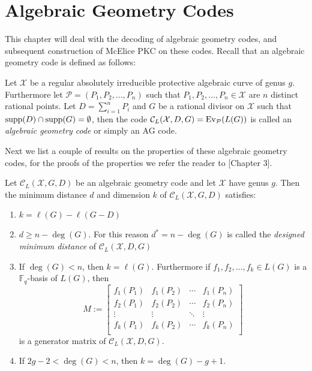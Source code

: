 \chapter{Algebraic Geometry Codes}
This chapter will deal with the decoding of algebraic geometry codes, and subsequent construction of McElice PKC on these codes. Recall that an algebraic geometry code is defined as follows:
\begin{definition}
Let $\mathcal{X}$ be a regular absolutely irreducible protective algebraic curve of genus $g$. Furthermore let $\mathcal{P}=\left(P_1, P_2, \ldots, P_{n}\right)$ such that $P_1, P_2, \ldots, P_{n} \in \mathcal{X}$ are $n$ distinct rational points. Let $D = \sum_{i = 1}^n P_{i}$ and $G$ be a rational divisor on $\mathcal{X}$ such that $\textnormal{supp} (D) \cap \textnormal{supp}(G) = \emptyset$, then the code $\mathcal{C}_{L}(\mathcal{X}, D, G) = \textnormal{Ev}_\mathcal{P}(L(G))$ is called an \textit{algebraic geometry code} or simply an AG code.
\end{definition}
Next we list a couple of results on the properties of these algebraic geometry codes, for the proofs of the properties we refer the reader to \cite{bachellor}[Chapter 3].
\begin{theorem}\label{thm:ag_codes_properties}
  Let $\mathcal{C}_{L}(\mathcal{X}, G, D)$ be an algebraic geometry code and let $\mathcal{X}$ have genus $g$. Then the minimum distance $d$ and dimension $k$ of $\mathcal{C}_L(\mathcal{X}, G, D)$ satisfies:
  \begin{enumerate}
    \item $k = \ell(G) - \ell(G - D)$ \label{thm:ag_codes_properties1}
    \item $d \geq n - \deg(G)$. For this reason $d^{*} = n - \deg(G)$ is called the \textit{designed minimum distance} of $\mathcal{C}_{L}(\mathcal{X}, D, G)$ \label{thm:ag_codes_properties2}
    \item If $\deg(G) < n$, then $k = \ell(G)$. Furthermore if $f_1, f_2, \ldots, f_{k} \in L(G)$ is a $\mathbb{F}_q$-basis of $L(G)$, then
          \begin{equation*}
            M := \begin{bmatrix}
                    f_1(P_1) & f_1(P_2) & \cdots & f_1(P_{n}) \\
                    f_2(P_1) & f_2(P_2) & \cdots & f_2(P_{n}) \\
                    \vdots & \vdots & \ddots & \vdots \\
                    f_k(P_1) & f_k(P_2) & \cdots & f_k(P_{n}) \\
                 \end{bmatrix}
          \end{equation*}
          is a generator matrix of $\mathcal{C}_{L}(\mathcal{X}, D, G)$.\label{thm:ag_codes_properties3}
    \item If $2g - 2 < \deg(G) < n$, then $k = \deg(G) - g + 1$.\label{thm:ag_codes_properties4}
  \end{enumerate}
\end{theorem}

